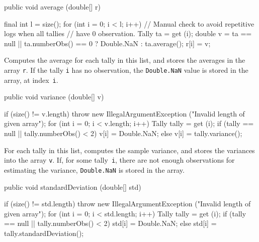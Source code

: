 \begin{htmlonly}
\end{htmlonly}
\begin{code}

   public void average (double[] r)\begin{hide} {
      final int l = size();
      for (int i = 0; i < l; i++) {
          // Manual check to avoid repetitive logs when all tallies
          // have 0 observation.
         Tally ta = get (i);
         double v = ta == null || ta.numberObs() == 0 ? Double.NaN : ta.average();
         r[i] = v;
      }
   }\end{hide}
\end{code}
\begin{tabb}   Computes the average for each tally
 in this list, and stores the averages in the array \texttt{r}.
 If the tally \texttt{i} has no observation,
 the \texttt{Double.NaN} value is stored
 in the array, at index~\texttt{i}.
\end{tabb}
\begin{code}

   public void variance (double[] v)\begin{hide} {
      if (size() != v.length)
         throw new IllegalArgumentException
            ("Invalid length of given array");
      for (int i = 0; i < v.length; i++) {
         Tally tally = get (i);
         if (tally == null || tally.numberObs() < 2)
            v[i] = Double.NaN;
         else
            v[i] = tally.variance();
      }
   }\end{hide}
\end{code}
\begin{tabb}   For each tally in this list, computes
 the sample variance, and stores the variances into the array \texttt{v}.
 If, for some tally~\texttt{i}, there are not enough
 observations for estimating the variance,
 \texttt{Double.NaN} is stored in the array.
\end{tabb}
\begin{htmlonly}
\end{htmlonly}
\begin{code}

   public void standardDeviation (double[] std)\begin{hide} {
      if (size() != std.length)
         throw new IllegalArgumentException
            ("Invalid length of given array");
      for (int i = 0; i < std.length; i++) {
         Tally tally = get (i);
         if (tally == null || tally.numberObs() < 2)
            std[i] = Double.NaN;
         else
            std[i] = tally.standardDeviation();
      }
   }\end{hide}
\end{code}

